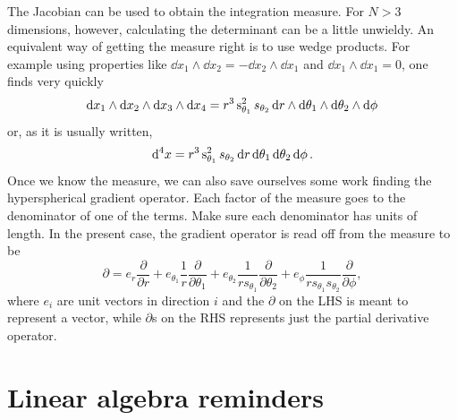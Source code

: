 The Jacobian can be used to obtain the integration measure. For $N>3$
dimensions, however, calculating the determinant can be a little
unwieldy. An equivalent way of getting the measure right is to
use wedge products. For example using properties like
$\dd{x_1}\wedge\dd{x_2}=-\dd{x_2}
  \wedge\dd{x_1}$ and $\dd{x_1}\wedge\dd{x_1}=0$, 
one finds very quickly
\begin{equation}
  \dd{x_1}\wedge\dd{x_2}\wedge\dd{x_3}\wedge\dd{x_4}
   =r^3\operatorname{s}_{\theta_1}^2s_{\theta_2} 
     \dd{r}\wedge\dd{\theta_1}\wedge\dd{\theta_2}\wedge\dd{\phi}
\end{equation}
or, as it is usually written,
\begin{equation}
  \dd[4]{x}=r^3\operatorname{s}_{\theta_1}^2s_{\theta_2}
             \dd{r}\dd{\theta_1}\dd{\theta_2}\dd{\phi}.
\end{equation}
Once we know the measure, we can also save ourselves some work
finding the hyperspherical gradient operator. Each factor of the
measure goes to the denominator of one of the terms. Make sure
each denominator has units of length. In the present case, the
gradient operator is read off from the measure to be
\begin{equation}\label{eq:4dgrad}
  \partial=e_r\frac{\partial}{\partial r}
   +e_{\theta_1}\frac{1}{r}\frac{\partial}{\partial \theta_1}
   +e_{\theta_2}\frac{1}{rs_{\theta_1}}\frac{\partial}{\partial \theta_2}
   +e_\phi\frac{1}{rs_{\theta_1}s_{\theta_2}}\frac{\partial}{\partial \phi},
\end{equation}
where $e_i$ are unit vectors in direction $i$ and the $\partial$ on
the LHS is meant to represent a vector, while $\partial$s on the RHS
represents just the partial derivative operator.

\section{Linear algebra reminders}

